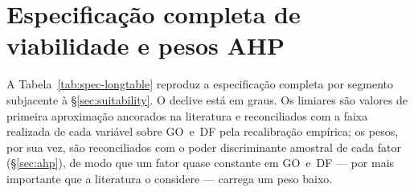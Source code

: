 \chapter{Especificação completa de viabilidade e pesos AHP}\label{anx:spec}

A Tabela~\ref{tab:spec-longtable} reproduz a especificação completa por segmento subjacente à
\S\ref{sec:suitability}. O declive está em graus. Os limiares são valores de primeira
aproximação ancorados na literatura e reconciliados com a faixa realizada de cada variável
sobre GO~e~DF pela recalibração empírica; os pesos, por sua vez, são reconciliados com o poder
discriminante amostral de cada fator (\S\ref{sec:ahp}), de modo que um fator quase constante em
GO~e~DF --- por mais importante que a literatura o considere --- carrega um peso baixo.

